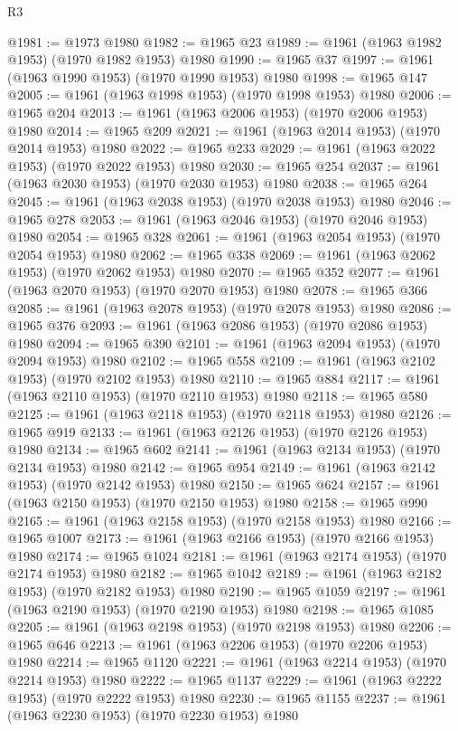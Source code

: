 \begin{lexlean}{R3}
\begin{coremodule}
@1981 := @1973 @1980
@1982 := @1965 @23
@1989 := @1961 (@1963 @1982 @1953) (@1970 @1982 @1953) @1980
@1990 := @1965 @37
@1997 := @1961 (@1963 @1990 @1953) (@1970 @1990 @1953) @1980
@1998 := @1965 @147
@2005 := @1961 (@1963 @1998 @1953) (@1970 @1998 @1953) @1980
@2006 := @1965 @204
@2013 := @1961 (@1963 @2006 @1953) (@1970 @2006 @1953) @1980
@2014 := @1965 @209
@2021 := @1961 (@1963 @2014 @1953) (@1970 @2014 @1953) @1980
@2022 := @1965 @233
@2029 := @1961 (@1963 @2022 @1953) (@1970 @2022 @1953) @1980
@2030 := @1965 @254
@2037 := @1961 (@1963 @2030 @1953) (@1970 @2030 @1953) @1980
@2038 := @1965 @264
@2045 := @1961 (@1963 @2038 @1953) (@1970 @2038 @1953) @1980
@2046 := @1965 @278
@2053 := @1961 (@1963 @2046 @1953) (@1970 @2046 @1953) @1980
@2054 := @1965 @328
@2061 := @1961 (@1963 @2054 @1953) (@1970 @2054 @1953) @1980
@2062 := @1965 @338
@2069 := @1961 (@1963 @2062 @1953) (@1970 @2062 @1953) @1980
@2070 := @1965 @352
@2077 := @1961 (@1963 @2070 @1953) (@1970 @2070 @1953) @1980
@2078 := @1965 @366
@2085 := @1961 (@1963 @2078 @1953) (@1970 @2078 @1953) @1980
@2086 := @1965 @376
@2093 := @1961 (@1963 @2086 @1953) (@1970 @2086 @1953) @1980
@2094 := @1965 @390
@2101 := @1961 (@1963 @2094 @1953) (@1970 @2094 @1953) @1980
@2102 := @1965 @558
@2109 := @1961 (@1963 @2102 @1953) (@1970 @2102 @1953) @1980
@2110 := @1965 @884
@2117 := @1961 (@1963 @2110 @1953) (@1970 @2110 @1953) @1980
@2118 := @1965 @580
@2125 := @1961 (@1963 @2118 @1953) (@1970 @2118 @1953) @1980
@2126 := @1965 @919
@2133 := @1961 (@1963 @2126 @1953) (@1970 @2126 @1953) @1980
@2134 := @1965 @602
@2141 := @1961 (@1963 @2134 @1953) (@1970 @2134 @1953) @1980
@2142 := @1965 @954
@2149 := @1961 (@1963 @2142 @1953) (@1970 @2142 @1953) @1980
@2150 := @1965 @624
@2157 := @1961 (@1963 @2150 @1953) (@1970 @2150 @1953) @1980
@2158 := @1965 @990
@2165 := @1961 (@1963 @2158 @1953) (@1970 @2158 @1953) @1980
@2166 := @1965 @1007
@2173 := @1961 (@1963 @2166 @1953) (@1970 @2166 @1953) @1980
@2174 := @1965 @1024
@2181 := @1961 (@1963 @2174 @1953) (@1970 @2174 @1953) @1980
@2182 := @1965 @1042
@2189 := @1961 (@1963 @2182 @1953) (@1970 @2182 @1953) @1980
@2190 := @1965 @1059
@2197 := @1961 (@1963 @2190 @1953) (@1970 @2190 @1953) @1980
@2198 := @1965 @1085
@2205 := @1961 (@1963 @2198 @1953) (@1970 @2198 @1953) @1980
@2206 := @1965 @646
@2213 := @1961 (@1963 @2206 @1953) (@1970 @2206 @1953) @1980
@2214 := @1965 @1120
@2221 := @1961 (@1963 @2214 @1953) (@1970 @2214 @1953) @1980
@2222 := @1965 @1137
@2229 := @1961 (@1963 @2222 @1953) (@1970 @2222 @1953) @1980
@2230 := @1965 @1155
@2237 := @1961 (@1963 @2230 @1953) (@1970 @2230 @1953) @1980

\end{coremodule}
\end{lexlean}
